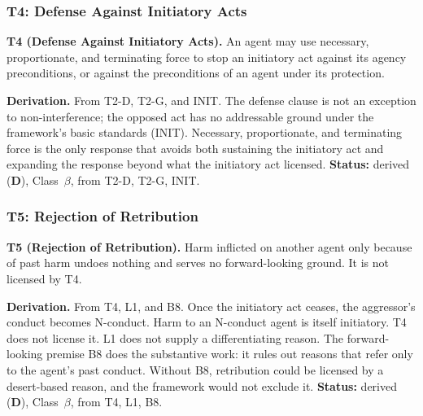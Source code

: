 \documentclass[11pt]{article}
\newcommand{\statusD}{\textcolor{stD}{\textbf{D}}}
\newcommand{\cb}{\texorpdfstring{Class~$\beta$}{Class beta}}
\begin{document}
\subsubsection{T4: Defense Against Initiatory Acts}
\begin{paperbox}
\textbf{T4 (Defense Against Initiatory Acts).} An agent may use necessary, proportionate, and terminating force to stop an initiatory act against its agency preconditions, or against the preconditions of an agent under its protection.
\end{paperbox}
\textbf{Derivation.} From T2-D, T2-G, and INIT. The defense clause is not an exception to non-interference; the opposed act has no addressable ground under the framework's basic standards (INIT). Necessary, proportionate, and terminating force is the only response that avoids both sustaining the initiatory act and expanding the response beyond what the initiatory act licensed. \textbf{Status:} derived (\statusD{}), \cb{}, from T2-D, T2-G, INIT.

\subsubsection{T5: Rejection of Retribution}
\begin{paperbox}
\textbf{T5 (Rejection of Retribution).} Harm inflicted on another agent only because of past harm undoes nothing and serves no forward-looking ground. It is not licensed by T4.
\end{paperbox}
\textbf{Derivation.} From T4, L1, and B8. Once the initiatory act ceases, the aggressor's conduct becomes N-conduct. Harm to an N-conduct agent is itself initiatory. T4 does not license it. L1 does not supply a differentiating reason. The forward-looking premise B8 does the substantive work: it rules out reasons that refer only to the agent's past conduct. Without B8, retribution could be licensed by a desert-based reason, and the framework would not exclude it. \textbf{Status:} derived (\statusD{}), \cb{}, from T4, L1, B8.
\end{document}
